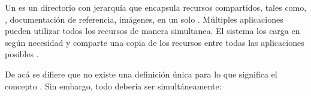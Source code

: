 Un \frameworkPC es un directorio con jerarquía que encapsula recursos compartidos, tales como, \dynamSharedLibAS, documentación de referencia, imágenes, en un solo \packageAS. Múltiples aplicaciones pueden utilizar todos los recursos de manera simultanea. El sistema los carga en \memoryPC según necesidad y comparte una copia de los recursos entre todas las aplicaciones posibles \cite{online_apple_what_is_framework}.

De acá se difiere que no existe una definición única para lo que significa el concepto \frameworkPC. Sin embargo, todo \frameworkPC debería ser simultáneamente: 

